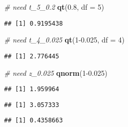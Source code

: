 \documentclass[]{article}
\newenvironment{Shaded}{\begin{snugshade}}{\end{snugshade}}
\newcommand{\CommentTok}[1]{\textcolor[rgb]{0.56,0.35,0.01}{\textit{#1}}}
\newcommand{\DataTypeTok}[1]{\textcolor[rgb]{0.13,0.29,0.53}{#1}}
\newcommand{\DecValTok}[1]{\textcolor[rgb]{0.00,0.00,0.81}{#1}}
\newcommand{\FloatTok}[1]{\textcolor[rgb]{0.00,0.00,0.81}{#1}}
\newcommand{\KeywordTok}[1]{\textcolor[rgb]{0.13,0.29,0.53}{\textbf{#1}}}
\newcommand{\NormalTok}[1]{#1}
\newcommand{\OperatorTok}[1]{\textcolor[rgb]{0.81,0.36,0.00}{\textbf{#1}}}
\begin{document}
\begin{Shaded}
\begin{Highlighting}[]
\CommentTok{# need t_5_0.2}
\KeywordTok{qt}\NormalTok{(}\FloatTok{0.8}\NormalTok{, }\DataTypeTok{df =} \DecValTok{5}\NormalTok{)}
\end{Highlighting}
\end{Shaded}

\begin{verbatim}
## [1] 0.9195438
\end{verbatim}

\begin{Shaded}
\begin{Highlighting}[]
\CommentTok{# need t_4_0.025}
\KeywordTok{qt}\NormalTok{(}\DecValTok{1}\FloatTok{-0.025}\NormalTok{, }\DataTypeTok{df =} \DecValTok{4}\NormalTok{)}
\end{Highlighting}
\end{Shaded}

\begin{verbatim}
## [1] 2.776445
\end{verbatim}

\begin{Shaded}
\begin{Highlighting}[]
\CommentTok{# need z_0.025}
\KeywordTok{qnorm}\NormalTok{(}\DecValTok{1}\FloatTok{-0.025}\NormalTok{)}
\end{Highlighting}
\end{Shaded}

\begin{verbatim}
## [1] 1.959964
\end{verbatim}

\begin{Shaded}
\end{Shaded}

\begin{verbatim}
## [1] 3.057333
\end{verbatim}

\begin{Shaded}
\end{Shaded}

\begin{verbatim}
## [1] 0.4358663
\end{verbatim}
\end{document}
